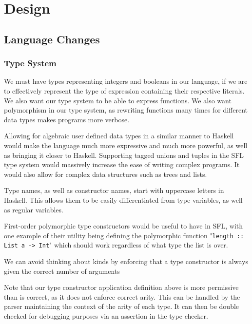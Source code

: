 \section{Design}

\subsection{Language Changes}
\subsubsection{Type System}
We must have types representing integers and booleans in our language, if we are to effectively represent the type of expression containing their respective literals. We also want our type system to be able to express functions. We also want polymorphism in our type system, as rewriting functions many times for different data types makes programs more verbose. 

Allowing for algebraic user defined data types in a similar manner to Haskell would make the language much more expressive and much more powerful, as well as bringing it closer to Haskell. Supporting tagged unions and tuples in the \ac{SFL} type system would massively increase the ease of writing complex programs. It would also allow for complex data structures such as trees and lists. 

Type names, as well as constructor names, start with uppercase letters in Haskell. This allows them to be easily differentiated from type variables, as well as regular variables. 

First-order polymorphic type constructors would be useful to have in \ac{SFL}, with one example of their utility being defining the polymorphic function "\verb|length :: List a -> Int|" which should work regardless of what type the list is over.



We can avoid thinking about kinds by enforcing that a type constructor is always given the correct number of arguments

Note that our type constructor application definition above is more permissive than is correct, as it does not enforce correct arity. This can be handled by the parser maintaining the context of the arity of each type. It can then be double checked for debugging purposes via an assertion in the type checker. 

